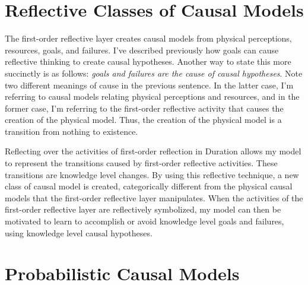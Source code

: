 \section{Reflective Classes of Causal Models}

The first-order reflective layer creates causal models from physical
perceptions, resources, goals, and failures.  I've described
previously how goals can cause reflective thinking to create causal
hypotheses.  Another way to state this more succinctly is as follows:
\emph{goals and failures are the cause of causal hypotheses}.  Note
two different meanings of cause in the previous sentence.  In the
latter case, I'm referring to causal models relating physical
perceptions and resources, and in the former case, I'm referring to
the first-order reflective activity that causes the creation of the
physical model.  Thus, the creation of the physical model is a
transition from nothing to existence.

Reflecting over the activities of first-order reflection in Duration
allows my model to represent the transitions caused by first-order
reflective activities.  These transitions are knowledge level changes.
By using this reflective technique, a new class of causal model is
created, categorically different from the physical causal models that
the first-order reflective layer manipulates.  When the activities of
the first-order reflective layer are reflectively symbolized, my model
can then be motivated to learn to accomplish or avoid knowledge level
goals and failures, using knowledge level causal hypotheses.

\section{Probabilistic Causal Models}

